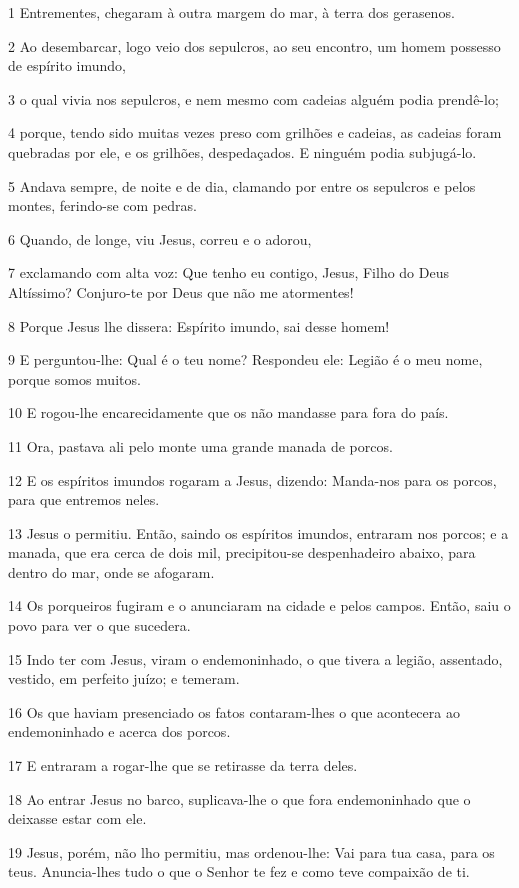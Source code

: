 \par 1 Entrementes, chegaram à outra margem do mar, à terra dos gerasenos.
\par 2 Ao desembarcar, logo veio dos sepulcros, ao seu encontro, um homem possesso de espírito imundo,
\par 3 o qual vivia nos sepulcros, e nem mesmo com cadeias alguém podia prendê-lo;
\par 4 porque, tendo sido muitas vezes preso com grilhões e cadeias, as cadeias foram quebradas por ele, e os grilhões, despedaçados. E ninguém podia subjugá-lo.
\par 5 Andava sempre, de noite e de dia, clamando por entre os sepulcros e pelos montes, ferindo-se com pedras.
\par 6 Quando, de longe, viu Jesus, correu e o adorou,
\par 7 exclamando com alta voz: Que tenho eu contigo, Jesus, Filho do Deus Altíssimo? Conjuro-te por Deus que não me atormentes!
\par 8 Porque Jesus lhe dissera: Espírito imundo, sai desse homem!
\par 9 E perguntou-lhe: Qual é o teu nome? Respondeu ele: Legião é o meu nome, porque somos muitos.
\par 10 E rogou-lhe encarecidamente que os não mandasse para fora do país.
\par 11 Ora, pastava ali pelo monte uma grande manada de porcos.
\par 12 E os espíritos imundos rogaram a Jesus, dizendo: Manda-nos para os porcos, para que entremos neles.
\par 13 Jesus o permitiu. Então, saindo os espíritos imundos, entraram nos porcos; e a manada, que era cerca de dois mil, precipitou-se despenhadeiro abaixo, para dentro do mar, onde se afogaram.
\par 14 Os porqueiros fugiram e o anunciaram na cidade e pelos campos. Então, saiu o povo para ver o que sucedera.
\par 15 Indo ter com Jesus, viram o endemoninhado, o que tivera a legião, assentado, vestido, em perfeito juízo; e temeram.
\par 16 Os que haviam presenciado os fatos contaram-lhes o que acontecera ao endemoninhado e acerca dos porcos.
\par 17 E entraram a rogar-lhe que se retirasse da terra deles.
\par 18 Ao entrar Jesus no barco, suplicava-lhe o que fora endemoninhado que o deixasse estar com ele.
\par 19 Jesus, porém, não lho permitiu, mas ordenou-lhe: Vai para tua casa, para os teus. Anuncia-lhes tudo o que o Senhor te fez e como teve compaixão de ti.
